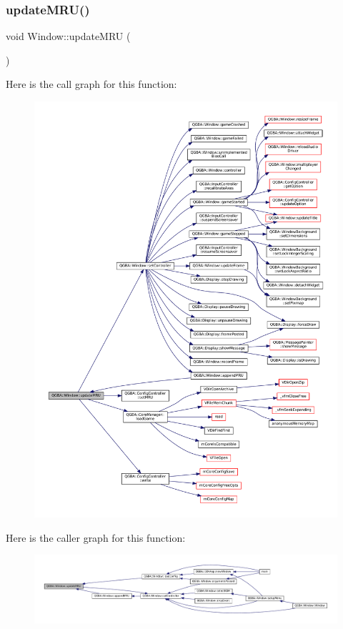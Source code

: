 \subsubsection{\texorpdfstring{update\+M\+R\+U()}{updateMRU()}}
{\footnotesize\ttfamily void Window\+::update\+M\+RU (\begin{DoxyParamCaption}{ }\end{DoxyParamCaption})\hspace{0.3cm}{\ttfamily [private]}}

Here is the call graph for this function\+:
\nopagebreak
\begin{figure}[H]
\begin{center}
\leavevmode
\includegraphics[width=350pt]{class_q_g_b_a_1_1_window_ac9d1c0d541f7088a9595e3a6bbb7992a_cgraph}
\end{center}
\end{figure}
Here is the caller graph for this function\+:
\nopagebreak
\begin{figure}[H]
\begin{center}
\leavevmode
\includegraphics[width=350pt]{class_q_g_b_a_1_1_window_ac9d1c0d541f7088a9595e3a6bbb7992a_icgraph}
\end{center}
\end{figure}
